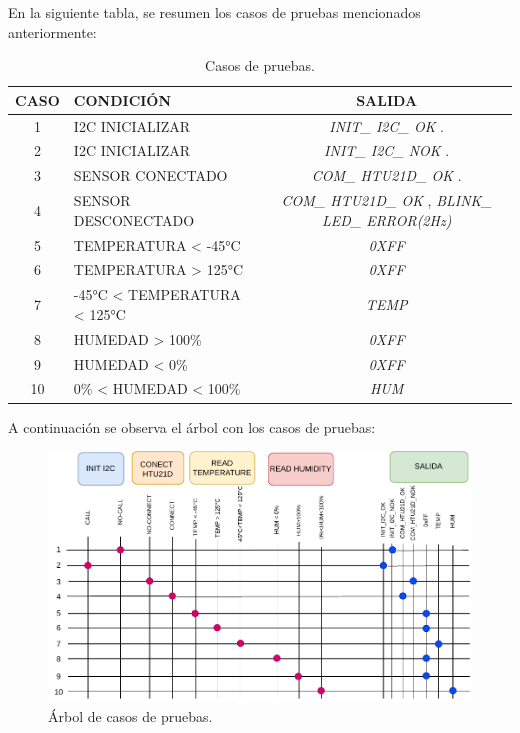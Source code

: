 \documentclass[11pt]{article}
\begin{document}
En la siguiente tabla, se resumen los casos de pruebas mencionados anteriormente:


\FloatBarrier
\begin{table}[!ht]
    \centering
    \begin{tabularx}{\linewidth}{@{}|c|X|c|@{}}\hline \hline
        \rowcolor[HTML]{d6c6c3}
 CASO & CONDICIÓN & SALIDA \\ 
        \hline     
      1 & I2C INICIALIZAR & \textit{INIT\_ I2C\_ OK }.  \\ 
        \hline
      2  & I2C INICIALIZAR & \textit{INIT\_ I2C\_ NOK }.  \\   
       \hline
      3 & SENSOR CONECTADO & \textit{COM\_ HTU21D\_ OK }.  \\
        \hline
      4 & SENSOR DESCONECTADO & \textit{COM\_ HTU21D\_ OK }, \textit{BLINK\_ LED\_ ERROR(2Hz) }\\
        \hline
      5 &TEMPERATURA < -45°C& \textit{0XFF}\\ 
        \hline
        6 &TEMPERATURA > 125°C& \textit{0XFF}\\ 
        \hline
        7 &-45°C < TEMPERATURA < 125°C& \textit{TEMP}\\ 
        \hline
         8 &HUMEDAD > 100\% & \textit{0XFF}\\ 
        \hline
         9 &HUMEDAD < 0\% & \textit{0XFF}\\ 
        \hline
         10 &0\% < HUMEDAD < 100\%& \textit{HUM}\\ 
          \hline
    \end{tabularx}
    \caption{Casos de pruebas.}
\end{table}
A continuación se observa el árbol con los casos de pruebas:
\FloatBarrier
\begin{figure}[!ht]
 \centering
\includegraphics[scale=1]{Figuras/casos.pdf} 
\caption{Árbol de casos de pruebas.}
\end{figure}
\end{document}
